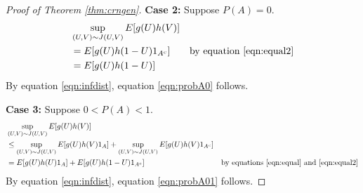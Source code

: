 \documentclass{article}
\theoremstyle{plain}%
\theoremstyle{definition}
\theoremstyle{remark}
\begin{document}
\begin{proof}[Proof of Theorem \ref{thm:crngen}]
		\textbf{Case 2:} Suppose $P(A)=0$.
		\begin{align*}
			&\sup_{(U, V) \sim J(U,V)} E[g(U)h(V)] \\
			&= E[g(U)h(1-U)1_{A^c}] &\text{by equation \ref{eqn:equal2}}\\
			&= E[g(U)h(1-U)]
		\end{align*}
		By equation \ref{eqn:infdist}, equation \ref{eqn:probA0} follows.
		
		\textbf{Case 3:}
		Suppose $0<P(A)<1$.
		\begin{align*}
			&\sup_{(U, V) \sim J(U,V)} E[g(U)h(V)] \\
			&\leq \sup_{(U, V) \sim J(U,V)} E[g(U)h(V)1_{A}] +  \sup_{(U, V) \sim J(U,V)} E[g(U)h(V)1_{A^c}] \\
			&= E[g(U)h(U)1_{A}] +  E[g(U)h(1-U)1_{A^c}] &\text{by equations \ref{eqn:equal} and \ref{eqn:equal2}}
		\end{align*}
		By equation \ref{eqn:infdist}, equation \ref{eqn:probA01} follows.
	\end{proof}
	
\end{document}
